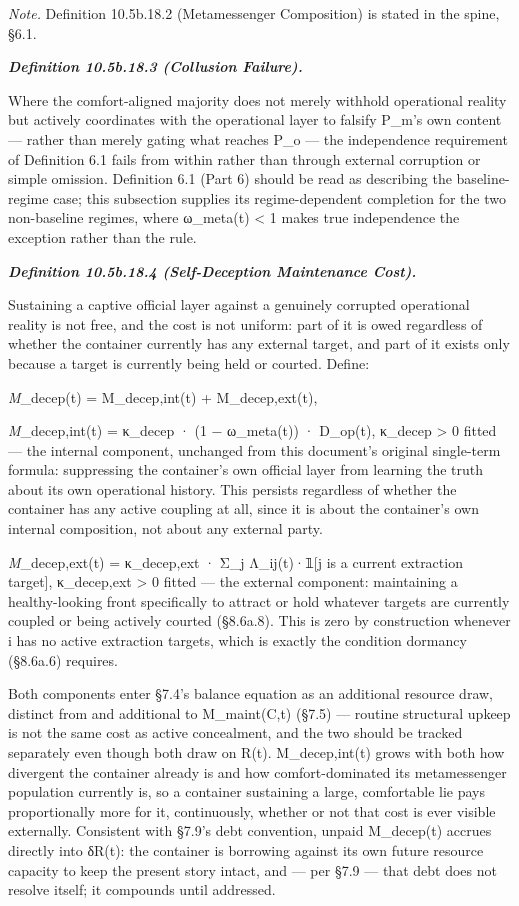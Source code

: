 \documentclass[
]{article}
\begin{document}
\emph{Note.} Definition 10.5b.18.2 (Metamessenger Composition) is stated
in the spine, §6.1.

\emph{\textbf{Definition 10.5b.18.3 (Collusion Failure).}}

Where the comfort-aligned majority does not merely withhold operational
reality but actively coordinates with the operational layer to falsify
P\_m's own content --- rather than merely gating what reaches P\_o ---
the independence requirement of Definition 6.1 fails from within rather
than through external corruption or simple omission. Definition 6.1
(Part 6) should be read as describing the baseline-regime case; this
subsection supplies its regime-dependent completion for the two
non-baseline regimes, where ω\_meta(t) \textless{} 1 makes true
independence the exception rather than the rule.

\emph{\textbf{Definition 10.5b.18.4 (Self-Deception Maintenance Cost).}}

Sustaining a captive official layer against a genuinely corrupted
operational reality is not free, and the cost is not uniform: part of it
is owed regardless of whether the container currently has any external
target, and part of it exists only because a target is currently being
held or courted. Define:

\emph{M}\_decep(t) = M\_decep,int(t) + M\_decep,ext(t),

\emph{M}\_decep,int(t) = κ\_decep · (1 − ω\_meta(t)) · D\_op(t),
κ\_decep \textgreater{} 0 fitted --- the internal component, unchanged
from this document's original single-term formula: suppressing the
container's own official layer from learning the truth about its own
operational history. This persists regardless of whether the container
has any active coupling at all, since it is about the container's own
internal composition, not about any external party.

\emph{M}\_decep,ext(t) = κ\_decep,ext · Σ\_j Λ\_ij(t)·𝟙{[}j is a current
extraction target{]}, κ\_decep,ext \textgreater{} 0 fitted --- the
external component: maintaining a healthy-looking front specifically to
attract or hold whatever targets are currently coupled or being actively
courted (§8.6a.8). This is zero by construction whenever i has no active
extraction targets, which is exactly the condition dormancy (§8.6a.6)
requires.

Both components enter §7.4's balance equation as an additional resource
draw, distinct from and additional to M\_maint(C,t) (§7.5) --- routine
structural upkeep is not the same cost as active concealment, and the
two should be tracked separately even though both draw on R(t).
M\_decep,int(t) grows with both how divergent the container already is
and how comfort-dominated its metamessenger population currently is, so
a container sustaining a large, comfortable lie pays proportionally more
for it, continuously, whether or not that cost is ever visible
externally. Consistent with §7.9's debt convention, unpaid M\_decep(t)
accrues directly into δR(t): the container is borrowing against its own
future resource capacity to keep the present story intact, and --- per
§7.9 --- that debt does not resolve itself; it compounds until
addressed.
\end{document}
